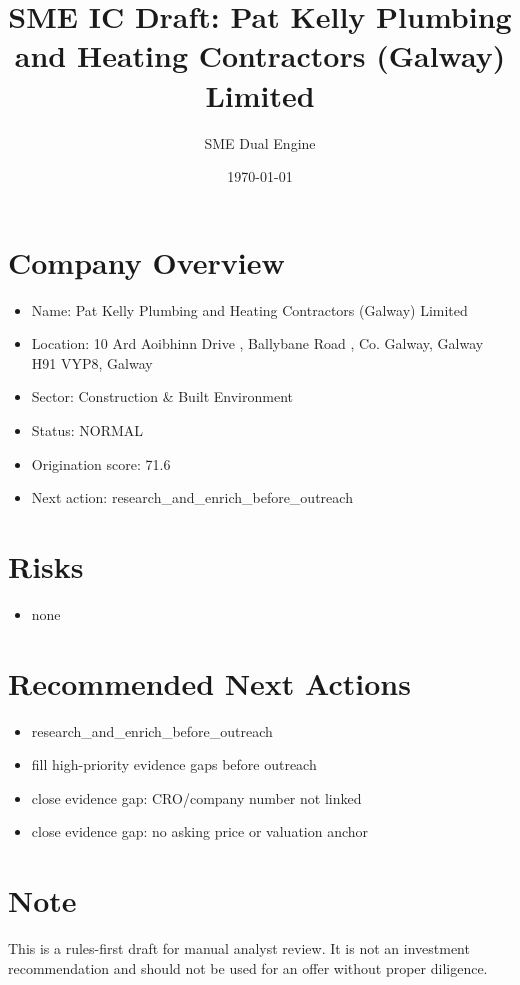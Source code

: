 \documentclass[11pt,a4paper]{article}
\title{SME IC Draft: Pat Kelly Plumbing and Heating Contractors (Galway) Limited}
\author{SME Dual Engine}
\date{\today}
\begin{document}
\maketitle
\section*{Company Overview}
\begin{itemize}[leftmargin=1.4em]
\item Name: Pat Kelly Plumbing and Heating Contractors (Galway) Limited
\item Location: 10 Ard Aoibhinn Drive , Ballybane Road , Co. Galway, Galway H91 VYP8, Galway
\item Sector: Construction \& Built Environment
\item Status: NORMAL
\item Origination score: 71.6
\item Next action: research\_and\_enrich\_before\_outreach
\end{itemize}
\section*{Risks}
\begin{itemize}[leftmargin=1.4em]
\item none
\end{itemize}
\section*{Recommended Next Actions}
\begin{itemize}[leftmargin=1.4em]
\item research\_and\_enrich\_before\_outreach
\item fill high-priority evidence gaps before outreach
\item close evidence gap: CRO/company number not linked
\item close evidence gap: no asking price or valuation anchor
\end{itemize}
\section*{Note}
This is a rules-first draft for manual analyst review. It is not an investment
recommendation and should not be used for an offer without proper diligence.
\end{document}
